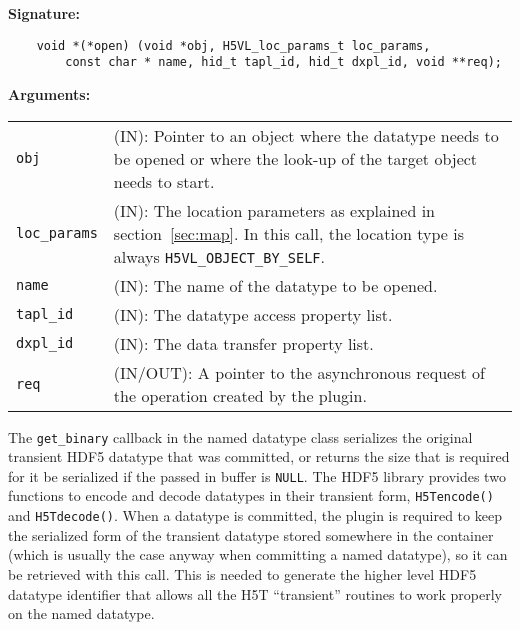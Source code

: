 \begin{mdframed}[style=bgbox]
\textbf{Signature:}
\begin{lstlisting}
    void *(*open) (void *obj, H5VL_loc_params_t loc_params, 
        const char * name, hid_t tapl_id, hid_t dxpl_id, void **req);
\end{lstlisting}

\textbf{Arguments:}\\
\begin{tabular}{l p{10cm}}
  \texttt{obj} & (IN): Pointer to an object where the datatype needs
  to be opened or where the look-up of the target object needs to
  start.\\
  \texttt{loc\_params} & (IN): The location parameters as explained in
  section~\ref{sec:map}. In this call, the location type is always \texttt{H5VL\_OBJECT\_BY\_SELF}. \\
  \texttt{name} & (IN): The name of the datatype to be opened.\\
  \texttt{tapl\_id} & (IN): The datatype access property list.\\
  \texttt{dxpl\_id} & (IN): The data transfer property list.\\
  \texttt{req} & (IN/OUT): A pointer to the asynchronous request of the
  operation created by the plugin.\\
\end{tabular}
\end{mdframed}

The \texttt{get\_binary} callback in the named datatype class
serializes the original transient HDF5 datatype that was committed, or
returns the size that is required for it be serialized if the passed in
buffer is \texttt{NULL}. The HDF5 library provides two functions to
encode and decode datatypes in their transient form, \texttt{H5Tencode()}
and \texttt{H5Tdecode()}. When a datatype is committed, the plugin is
required to keep the serialized form of the transient datatype stored
somewhere in the container (which is usually the case anyway when
committing a named datatype), so it can be retrieved with this
call. This is needed to generate the higher level HDF5 datatype
identifier that allows all the H5T ``transient'' routines to work
properly on the named datatype.\bigskip

